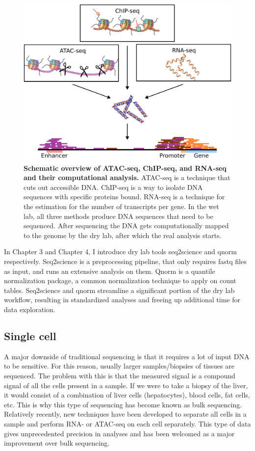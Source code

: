 \begin{figure}
    \center
    \includegraphics[width=0.8\linewidth]{ch.introduction/imgs/analysis.png}
    \caption{\textbf{Schematic overview of ATAC-seq, ChIP-seq, and RNA-seq and their computational analysis.} ATAC-seq is a technique that cuts out accessible DNA. ChIP-seq is a way to isolate DNA sequences with specific proteins bound. RNA-seq is a technique for the estimation for the number of transcripts per gene. In the wet lab, all three methods produce DNA sequences that need to be sequenced. After sequencing the DNA gets computationally mapped to the genome by the dry lab, after which the real analysis starts. }
    \label{fig:analysis}
\end{figure}

In Chapter 3 and Chapter 4, I introduce dry lab tools seq2science and qnorm respectively. Seq2science is a preprocessing pipeline, that only requires fastq files as input, and runs an extensive analysis on them. Qnorm is a quantile normalization package, a common normalization technique to apply on count tables. Seq2science and qnorm streamline a significant portion of the dry lab workflow, resulting in standardized analyses and freeing up additional time for data exploration.

\subsection{Single cell}

A major downside of traditional sequencing is that it requires a lot of input DNA to be sensitive. For this reason, usually larger samples/biopsies of tissues are sequenced. The problem with this is that the measured signal is a compound signal of all the cells present in a sample. If we were to take a biopsy of the liver, it would consist of a combination of liver cells (hepatocytes), blood cells, fat cells, etc. This is why this type of sequencing has become known as bulk sequencing. Relatively recently, new techniques have been developed to separate all cells in a sample and perform RNA- or ATAC-seq on each cell separately\cite{Buenrostro2015_sc,Tang2009}. This type of data gives unprecedented precision in analyses and has been welcomed as a major improvement over bulk sequencing.

